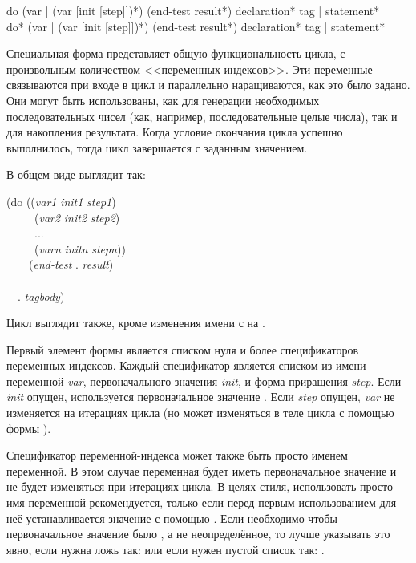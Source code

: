 \begin{defmac}
do ({var | (var [init [step]])}*)
   (end-test {result}*)
   {declaration}* {tag | statement}* \\
do* ({var | (var [init [step]])}*)
    (end-test {result}*)
    {declaration}* {tag | statement}*

Специальная форма  представляет общую функциональность цикла, с
произвольным количеством <<переменных-индексов>>.
Эти переменные связываются при входе в цикл и параллельно наращиваются, как это
было задано. Они могут быть использованы, как для генерации необходимых
последовательных чисел (как, например, последовательные целые числа), так и для
накопления результата.
Когда условие окончания цикла успешно выполнилось, тогда цикл завершается с
заданным значением.

В общем виде  выглядит так:
\begin{lisp}
(do ((\emph{var1} \emph{init1} \emph{step1}) \\
~~~~~(\emph{var2} \emph{init2} \emph{step2}) \\
~~~~~... \\
~~~~~(\emph{varn} \emph{initn} \emph{stepn})) \\
~~~~(\emph{end-test} . \emph{result}) \\
~~ \\
~~. \emph{tagbody})
\end{lisp}
Цикл  выглядит также, кроме изменения имени с  на .

Первый элемент формы является списком нуля и более спецификаторов
переменных-индексов. Каждый спецификатор является списком из имени переменной
\emph{var}, первоначального значения \emph{init}, и форма приращения
\emph{step}.
Если \emph{init} опущен, используется первоначальное значение {\false}.
Если \emph{step} опущен, \emph{var} не изменяется на итерациях цикла (но может
изменяться в теле цикла с помощью формы ).

Спецификатор переменной-индекса может также быть просто именем переменной.
В этом случае переменная будет иметь первоначальное значение {\false} и не будет
изменяться при итерациях цикла.
В целях стиля, использовать просто имя переменной рекомендуется, только если перед
первым использованием для неё устанавливается значение с помощью .
Если необходимо чтобы первоначальное значение было {\false}, а не
неопределённое, то лучше указывать это явно, если нужна ложь так:
или если нужен пустой список так:
.


\end{defmac}
